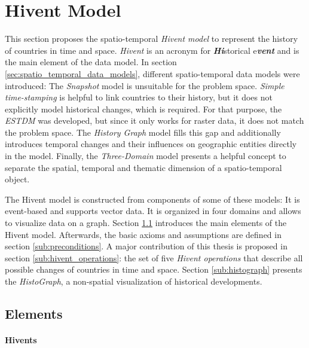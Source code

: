 
\section{Hivent Model} %
\label{sec:hivent_model}

This section proposes the spatio-temporal \emph{Hivent model} to represent the history of countries in time and space. \emph{Hivent} is an acronym for \emph{\textbf{Hi}}storical e\emph{\textbf{vent}} and is the main element of the data model. In section \ref{sec:spatio_temporal_data_models}, different spatio-temporal data models were introduced: The \emph{Snapshot} model is unsuitable for the problem space. \emph{Simple time-stamping} is helpful to link countries to their history, but it does not explicitly model historical changes, which is required. For that purpose, the \emph{ESTDM} was developed, but since it only works for raster data, it does not match the problem space. The \emph{History Graph} model fills this gap and additionally introduces temporal changes and their influences on geographic entities directly in the model. Finally, the \emph{Three-Domain} model presents a helpful concept to separate the spatial, temporal and thematic dimension of a spatio-temporal object.

The Hivent model is constructed from components of some of these models: It is event-based and supports vector data. It is organized in four domains and allows to visualize data on a graph.
Section \ref{sub:elements} introduces the main elements of the Hivent model. Afterwards, the basic axioms and assumptions are defined in section \ref{sub:preconditions}. A major contribution of this thesis is proposed in section \ref{sub:hivent_operations}: the set of five \emph{Hivent operations} that describe all possible changes of countries in time and space.
Section \ref{sub:histograph} presents the \emph{HistoGraph}, a non-spatial visualization of historical developments.

\subsection{Elements} %
\label{sub:elements}

\paragraph{Hivents} %
\label{par:hivent}

